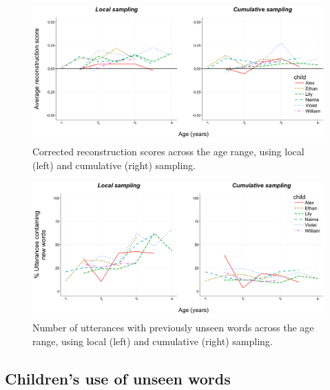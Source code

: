 \documentclass[man,mask,floatsintext]{apa6}
\begin{document}
\begin{figure}

{\centering \includegraphics[width=0.95\linewidth]{images/plotbothreconstruction} 

}

\caption{Corrected reconstruction scores across the age range, using local (left) and cumulative (right) sampling.}\label{fig:fig5}
\end{figure}

\begin{figure}

{\centering \includegraphics[width=0.95\linewidth]{images/plotbothunknown} 

}

\caption{Number of utterances with previously unseen words across the age range, using local (left) and cumulative (right) sampling.}\label{fig:fig6}
\end{figure}

\subsection{Children's use of unseen
words}\label{childrens-use-of-unseen-words}
\end{document}
